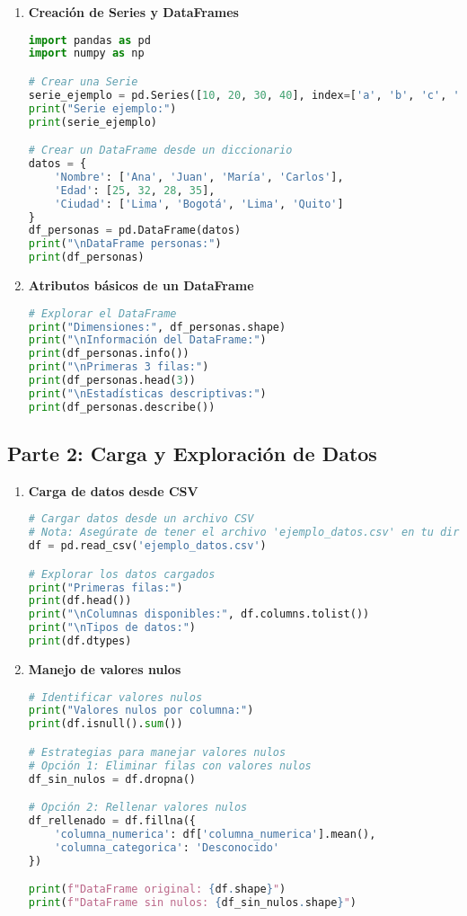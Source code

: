 \documentclass[a4paper,12pt]{article}
\begin{document}
\begin{enumerate}
    \item \textbf{Creación de Series y DataFrames}
    \begin{lstlisting}[language=Python]
import pandas as pd
import numpy as np

# Crear una Serie
serie_ejemplo = pd.Series([10, 20, 30, 40], index=['a', 'b', 'c', 'd'])
print("Serie ejemplo:")
print(serie_ejemplo)

# Crear un DataFrame desde un diccionario
datos = {
    'Nombre': ['Ana', 'Juan', 'María', 'Carlos'],
    'Edad': [25, 32, 28, 35],
    'Ciudad': ['Lima', 'Bogotá', 'Lima', 'Quito']
}
df_personas = pd.DataFrame(datos)
print("\nDataFrame personas:")
print(df_personas)
    \end{lstlisting}

    \item \textbf{Atributos básicos de un DataFrame}
    \begin{lstlisting}[language=Python]
# Explorar el DataFrame
print("Dimensiones:", df_personas.shape)
print("\nInformación del DataFrame:")
print(df_personas.info())
print("\nPrimeras 3 filas:")
print(df_personas.head(3))
print("\nEstadísticas descriptivas:")
print(df_personas.describe())
    \end{lstlisting}
\end{enumerate}

\subsection{Parte 2: Carga y Exploración de Datos}

\begin{enumerate}
    \item \textbf{Carga de datos desde CSV}
    \begin{lstlisting}[language=Python]
# Cargar datos desde un archivo CSV
# Nota: Asegúrate de tener el archivo 'ejemplo_datos.csv' en tu directorio
df = pd.read_csv('ejemplo_datos.csv')

# Explorar los datos cargados
print("Primeras filas:")
print(df.head())
print("\nColumnas disponibles:", df.columns.tolist())
print("\nTipos de datos:")
print(df.dtypes)
    \end{lstlisting}

    \item \textbf{Manejo de valores nulos}
    \begin{lstlisting}[language=Python]
# Identificar valores nulos
print("Valores nulos por columna:")
print(df.isnull().sum())

# Estrategias para manejar valores nulos
# Opción 1: Eliminar filas con valores nulos
df_sin_nulos = df.dropna()

# Opción 2: Rellenar valores nulos
df_rellenado = df.fillna({
    'columna_numerica': df['columna_numerica'].mean(),
    'columna_categorica': 'Desconocido'
})

print(f"DataFrame original: {df.shape}")
print(f"DataFrame sin nulos: {df_sin_nulos.shape}")
    \end{lstlisting}
\end{enumerate}
\end{document}
